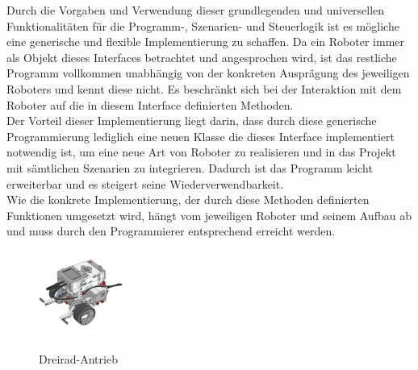 Durch die Vorgaben und Verwendung dieser grundlegenden und universellen Funktionalitäten für die Programm-, Szenarien- und Steuerlogik 
ist es mögliche eine generische und flexible Implementierung zu schaffen. Da ein Roboter immer als Objekt dieses Interfaces betrachtet 
und angesprochen wird, ist das restliche Programm vollkommen unabhängig von der konkreten Ausprägung des jeweiligen Roboters und kennt 
diese nicht. Es beschränkt sich bei der Interaktion mit dem Roboter auf die in diesem Interface definierten Methoden. \\
Der Vorteil dieser Implementierung liegt darin, dass durch diese generische Programmierung lediglich eine neuen Klasse die dieses 
Interface implementiert notwendig ist, um eine neue Art von Roboter zu realisieren und in das Projekt mit sämtlichen Szenarien zu 
integrieren. Dadurch ist das Programm leicht erweiterbar und es steigert seine Wiederverwendbarkeit. \\
Wie die konkrete Implementierung, der durch diese Methoden definierten Funktionen umgesetzt wird, hängt vom jeweiligen
Roboter und seinem Aufbau ab und muss durch den Programmierer entsprechend erreicht werden.
\pagebreak
\begin{figure}
	\vspace{+0.0cm}
	\begin{center}
		\includegraphics[width=0.25\textwidth]{images/implementation/threewheeldrive.png}
	\end{center}
	\caption{Dreirad-Antrieb}
	\cite{Lego.LEGOMINDSTORMS}
	\label{fig:dreirad}
\end{figure}
